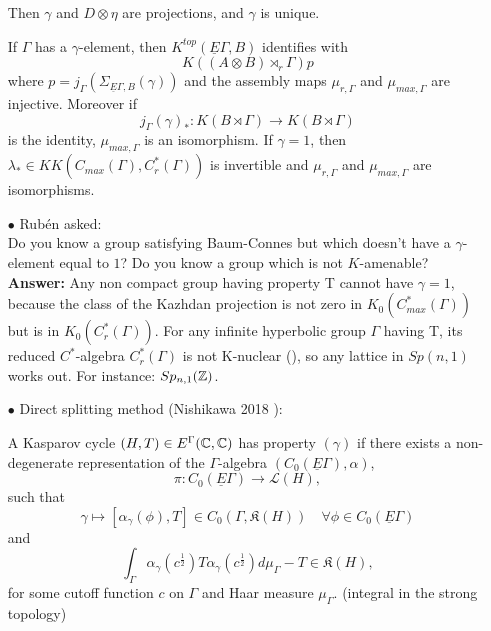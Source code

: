 \begin{itemize}
Then $\gamma$ and $D\otimes \eta$ are projections, and $\gamma$ is unique. \\

\begin{thm}
If $\Gamma$ has a $\gamma$-element, then $K^{top}(\underline E\Gamma,B)$ identifies with 
\[K((A\otimes B)\rtimes_r \Gamma) p\]
where $p= j_\Gamma(\Sigma_{\underline E \Gamma, B}(\gamma))$ and the assembly maps $\mu_{r,\Gamma}$ and $\mu_{max,\Gamma}$ are injective. Moreover if
\[j_\Gamma(\gamma)_* : K(B\rtimes\Gamma) \rightarrow K(B\rtimes \Gamma) \]
is the identity, $\mu_{max,\Gamma}$ is an isomorphism. If $\gamma=1$, then $\lambda_*\in KK(C_{max}(\Gamma), C^*_r(\Gamma))$ is invertible and $\mu_{r,\Gamma}$ and $\mu_{max,\Gamma}$ are isomorphisms.\\
\end{thm}

\item[$\bullet$] Rub\'en asked: \\

Do you know a group satisfying Baum-Connes but which doesn't have a $\gamma$-element equal to $1$?   Do you know a group which is not $K$-amenable? \\

\textbf{Answer:} Any non compact group having property T cannot have $\gamma=1$, because the class of the Kazhdan projection is not zero in $K_0(C_{max}^*(\Gamma))$ but is in $K_0(C_{r}^*(\Gamma))$. For any infinite hyperbolic group $\Gamma$ having T, its reduced $C^*$-algebra $C^*_r(\Gamma)$ is not K-nuclear (\cite{skandalis1988notion}), so any lattice in $Sp(n,1)$ works out. For instance: $Sp_{n,1}(\mathbb Z)$.\\

\item[$\bullet$] Direct splitting method (Nishikawa 2018 \cite{nishikawa2018direct}):\\

\begin{definition} A Kasparov cycle $(H,T)\in E^\Gamma(\mathbb C,\mathbb C)$ has property $(\gamma)$ if there exists a non-degenerate representation of the $\Gamma$-algebra $(C_0(\underline E \Gamma),\alpha)$,
\[\pi : C_0(\underline E \Gamma) \rightarrow \mathcal L(H),\]
such that
\[\gamma \mapsto [\alpha_\gamma(\phi ), T] \in C_0(\Gamma, \mathfrak K(H)) \quad\forall \phi \in C_0(\underline E\Gamma)\]
and 
\[\int_\Gamma \alpha_\gamma(c^\frac{1}{2}) T \alpha_\gamma(c^\frac{1}{2})d\mu_\Gamma - T\in \mathfrak K(H),\]
for some cutoff function $c$ on $\Gamma$ and Haar measure $\mu_\Gamma$. (integral in the strong topology)\\
\end{definition}


\end{itemize}
